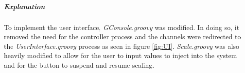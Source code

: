 \documentclass[10pt, a4paper]{article}
\begin{document}
   \subparagraph{Explanation} \hfill
   
   To implement the user interface, \textit{GConsole.groovy} was modified. In doing so, it removed the need for the controller process and the channels were redirected to the \textit{UserInterface.groovy} process as seen in figure \ref{fig:UI}. \textit{Scale.groovy} was also heavily modified to allow for the user to input values to inject into the system and for the button to suspend and resume scaling.
   
  
	
\end{document}
